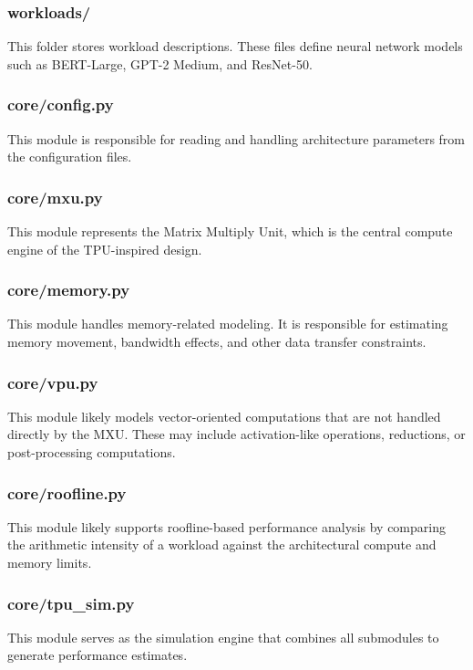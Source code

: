 \documentclass[12pt,a4paper]{article}
\begin{document}
	\subsubsection{workloads/}
	This folder stores workload descriptions. These files define neural network models such as BERT-Large, GPT-2 Medium, and ResNet-50.
	
	\subsubsection{core/config.py}
	This module is responsible for reading and handling architecture parameters from the configuration files.
	
	\subsubsection{core/mxu.py}
	This module represents the Matrix Multiply Unit, which is the central compute engine of the TPU-inspired design.
	
	\subsubsection{core/memory.py}
	This module handles memory-related modeling. It is responsible for estimating memory movement, bandwidth effects, and other data transfer constraints.
	
	\subsubsection{core/vpu.py}
	This module likely models vector-oriented computations that are not handled directly by the MXU. These may include activation-like operations, reductions, or post-processing computations.
	
	\subsubsection{core/roofline.py}
	This module likely supports roofline-based performance analysis by comparing the arithmetic intensity of a workload against the architectural compute and memory limits.
	
	\subsubsection{core/tpu\_sim.py}
	This module serves as the simulation engine that combines all submodules to generate performance estimates.
	
\end{document}
